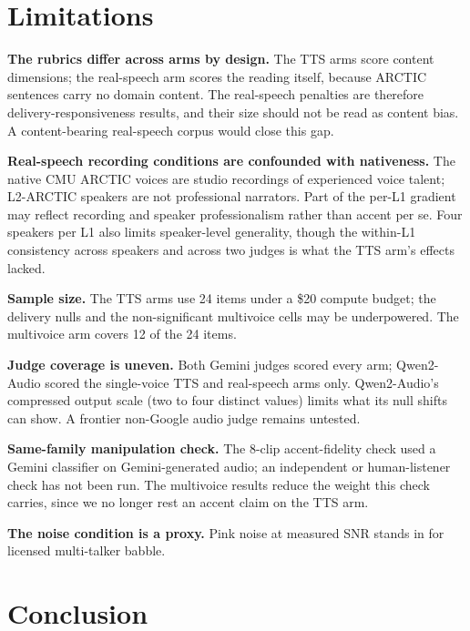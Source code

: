 \section{Limitations}
\label{sec:limitations}

\textbf{The rubrics differ across arms by design.} The TTS arms score
content dimensions; the real-speech arm scores the reading itself, because
ARCTIC sentences carry no domain content. The real-speech penalties are
therefore delivery-responsiveness results, and their size should not be
read as content bias. A content-bearing real-speech corpus would close this
gap.

\textbf{Real-speech recording conditions are confounded with nativeness.}
The native CMU ARCTIC voices are studio recordings of experienced voice
talent; L2-ARCTIC speakers are not professional narrators. Part of the
per-L1 gradient may reflect recording and speaker professionalism rather
than accent per se. Four speakers per L1 also limits speaker-level
generality, though the within-L1 consistency across speakers and across two
judges is what the TTS arm's effects lacked.

\textbf{Sample size.} The TTS arms use 24 items under a \$20 compute
budget; the delivery nulls and the non-significant multivoice cells may be
underpowered. The multivoice arm covers 12 of the 24 items.

\textbf{Judge coverage is uneven.} Both Gemini judges scored every arm;
Qwen2-Audio scored the single-voice TTS and real-speech arms only.
Qwen2-Audio's compressed output scale (two to four distinct values) limits
what its null shifts can show. A frontier non-Google audio judge remains
untested.

\textbf{Same-family manipulation check.} The 8-clip accent-fidelity check
used a Gemini classifier on Gemini-generated audio; an independent or
human-listener check has not been run. The multivoice results reduce the
weight this check carries, since we no longer rest an accent claim on the
TTS arm.

\textbf{The noise condition is a proxy.} Pink noise at measured SNR stands
in for licensed multi-talker babble.

\section{Conclusion}

